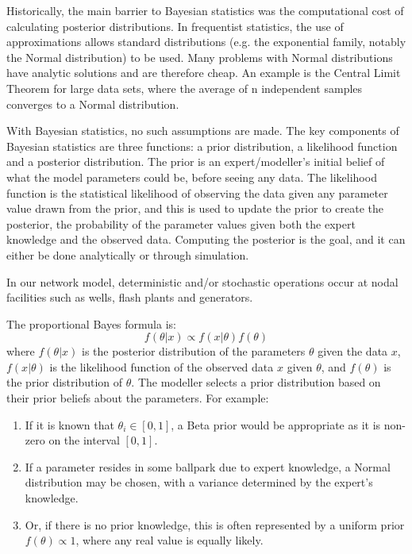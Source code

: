 \documentclass[a4paper, 12pt]{article}
\begin{document}
Historically, the main barrier to Bayesian statistics was the computational cost of calculating posterior distributions. In frequentist statistics, the use of approximations allows standard distributions (e.g. the exponential family, notably the Normal distribution) to be used. Many problems with Normal distributions have analytic solutions and are therefore cheap. An example is the Central Limit Theorem for large data sets, where the average of n independent samples converges to a Normal distribution.

With Bayesian statistics, no such assumptions are made. The key components of Bayesian statistics are three functions: a prior distribution, a likelihood function and a posterior distribution. The prior is an expert/modeller's initial belief of what the model parameters could be, before seeing any data. The likelihood function is the statistical likelihood of observing the data given any parameter value drawn from the prior, and this is used to update the prior to create the posterior, the probability of the parameter values given both the expert knowledge and the observed data. Computing the posterior is the goal, and it can either be done analytically or through simulation.

In our network model, deterministic and/or stochastic operations occur at nodal facilities such as wells, flash plants and generators.

The proportional Bayes formula is:
\begin{equation}
f(\theta|x) \propto f(x|\theta)f(\theta)
\end{equation}
where $f(\theta|x)$ is the posterior distribution of the parameters $\theta$ given the data $x$, $f(x|\theta)$ is the likelihood function of the observed data $x$ given $\theta$, and $f(\theta)$ is the prior distribution of $\theta$. The modeller selects a prior distribution based on their prior beliefs about the parameters. For example:

\begin{enumerate}
\item If it is known that $\theta_i \in [0,1]$, a Beta prior would be appropriate as it is non-zero on the interval $[0, 1]$. 
\item If a parameter resides in some ballpark due to expert knowledge, a Normal distribution may be chosen, with a variance determined by the expert's knowledge.
\item Or, if there is no prior knowledge, this is often represented by a uniform prior $f(\theta)\propto 1$, where any real value is equally likely.
\end{enumerate}
\end{document}
